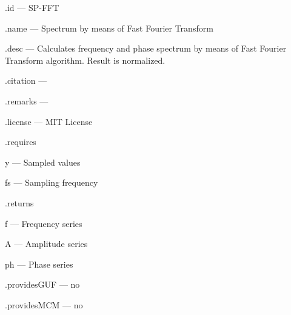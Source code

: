 \begin{tightdesc}
\item [\textsf{.id}] --- SP-FFT
\item [\textsf{.name}] --- Spectrum by means of Fast Fourier Transform
\item [\textsf{.desc}] --- Calculates frequency and phase spectrum by means of Fast Fourier Transform algorithm. Result is normalized.
\item [\textsf{.citation}] --- 
\item [\textsf{.remarks}] --- 
\item [\textsf{.license}] --- MIT License
\item [\textsf{.requires}] \rule{0em}{0em}
\begin{tightdesc}
\item [\textsf{y}] --- Sampled values
\item [\textsf{fs}] --- Sampling frequency
\end{tightdesc}
\item [\textsf{.returns}] \rule{0em}{0em}
\begin{tightdesc}
\item [\textsf{f}] --- Frequency series
\item [\textsf{A}] --- Amplitude series
\item [\textsf{ph}] --- Phase series
\end{tightdesc}
\item [\textsf{.providesGUF}] --- no
\item [\textsf{.providesMCM}] ---  no
\end{tightdesc}
